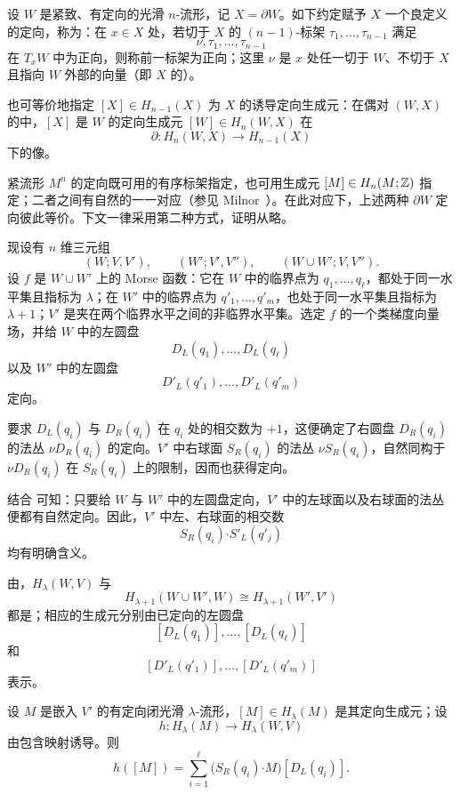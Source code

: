 
设 $W$ 是紧致、有定向的光滑 $n$-流形，记 $X=\partial W$。如下约定赋予 $X$ 一个良定义的定向，称为\emph{}：在 $x\in X$ 处，若切于 $X$ 的 $(n-1)$-标架 $\tau_1,\ldots,\tau_{n-1}$ 满足
\[
  \nu,\tau_1,\ldots,\tau_{n-1}
\]
在 $T_xW$ 中为正向，则称前一标架为正向；这里 $\nu$ 是 $x$ 处任一切于 $W$、不切于 $X$ 且指向 $W$ 外部的向量（即 $X$ 的）。

也可等价地指定 $[X]\in H_{n-1}(X)$ 为 $X$ 的诱导定向生成元：在偶对 $(W,X)$ 的中，$[X]$ 是 $W$ 的定向生成元 $[W]\in H_n(W,X)$ 在
\[
  \partial:H_n(W,X)\longrightarrow H_{n-1}(X)
\]
下的像。

\Remark 紧流形 $M^n$ 的定向既可用的有序标架指定，也可用生成元 $[M]\in H_n(M;\mathbb{Z})$ 指定；二者之间有自然的一一对应（参见 Milnor~\cite[p.~21]{ref19}）。在此对应下，上述两种 $\partial W$ 定向彼此等价。下文一律采用第二种方式，证明从略。

现设有 $n$ 维三元组
\[
  (W;V,V'),\qquad (W';V',V''),\qquad
  (W\cup W';V,V'').
\]
设 $f$ 是 $W\cup W'$ 上的 Morse 函数：它在 $W$ 中的临界点为 $q_1,\ldots,q_\ell$，都处于同一水平集且指标为 $\lambda$；在 $W'$ 中的临界点为 $q'_1,\ldots,q'_m$，也处于同一水平集且指标为 $\lambda+1$；$V'$ 是夹在两个临界水平之间的非临界水平集。选定 $f$ 的一个类梯度向量场，并给 $W$ 中的左圆盘
\[
  D_L(q_1),\ldots,D_L(q_\ell)
\]
以及 $W'$ 中的左圆盘
\[
  D'_L(q'_1),\ldots,D'_L(q'_m)
\]
定向。

要求 $D_L(q_i)$ 与 $D_R(q_i)$ 在 $q_i$ 处的相交数为 $+1$，这便确定了右圆盘 $D_R(q_i)$ 的法丛 $\nu D_R(q_i)$ 的定向。$V'$ 中右球面 $S_R(q_i)$ 的法丛 $\nu S_R(q_i)$，自然同构于 $\nu D_R(q_i)$ 在 $S_R(q_i)$ 上的限制，因而也获得定向。

结合 可知：只要给 $W$ 与 $W'$ 中的左圆盘定向，$V'$ 中的左球面以及右球面的法丛便都有自然定向。因此，$V'$ 中左、右球面的相交数
\[
  S_R(q_i)\mathbin{\boldsymbol\cdot}S'_L(q'_j)
\]
均有明确含义。

由，$H_\lambda(W,V)$ 与
\[
  H_{\lambda+1}(W\cup W',W)
  \cong H_{\lambda+1}(W',V')
\]
都是；相应的生成元分别由已定向的左圆盘
\[
  [D_L(q_1)],\ldots,[D_L(q_\ell)]
\]
和
\[
  [D'_L(q'_1)],\ldots,[D'_L(q'_m)]
\]
表示。

设 $M$ 是嵌入 $V'$ 的有定向闭光滑 $\lambda$-流形，$[M]\in H_\lambda(M)$ 是其定向生成元；设
\[
  h:H_\lambda(M)\longrightarrow H_\lambda(W,V)
\]
由包含映射诱导。则
\[
  h([M])=
  \sum_{i=1}^{\ell}
  \bigl(S_R(q_i)\mathbin{\boldsymbol\cdot}M\bigr)[D_L(q_i)].
\]

